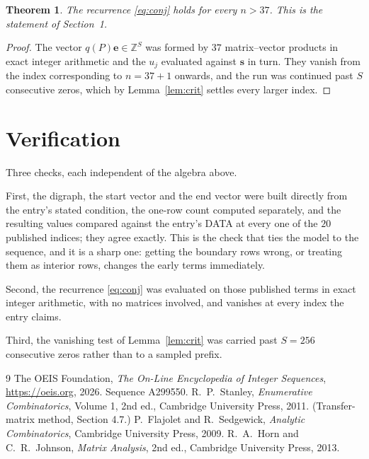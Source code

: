 \documentclass[11pt,a4paper]{article}
\theoremstyle{plain}
\newtheorem{theorem}{Theorem}
\theoremstyle{definition}
\begin{document}
\begin{theorem}
The recurrence \eqref{eq:conj} holds for every $n>37$. This is the statement of
Section~1.
\end{theorem}

\begin{proof}
The vector $q(P)\mathbf{e}\in\mathbb{Z}^{S}$ was formed by $37$ matrix--vector
products in exact integer arithmetic and the $u_j$ evaluated against $\mathbf{s}$ in turn.
They vanish from the index corresponding to $n=37+1$ onwards, and the run was continued
past $S$ consecutive zeros, which by Lemma~\ref{lem:crit} settles every larger index.
\end{proof}

\section{Verification}

Three checks, each independent of the algebra above.

First, the digraph, the start vector and the end vector were built directly from the
entry's stated condition, the one-row count computed separately, and the resulting values
compared against the entry's DATA at every one of the $20$ published indices; they
agree exactly. This is the check that ties the model to the sequence, and it is a sharp one:
getting the boundary rows wrong, or treating them as interior rows, changes the early terms
immediately.

Second, the recurrence \eqref{eq:conj} was evaluated on those published terms in exact
integer arithmetic, with no matrices involved, and vanishes at every index the entry claims.

Third, the vanishing test of Lemma~\ref{lem:crit} was carried past $S=256$ consecutive
zeros rather than to a sampled prefix.

\begin{thebibliography}{9}
 The OEIS Foundation, \emph{The On-Line Encyclopedia of Integer
Sequences}, \url{https://oeis.org}, 2026. Sequence A299550.
 R.~P.~Stanley, \emph{Enumerative Combinatorics}, Volume 1, 2nd ed.,
Cambridge University Press, 2011. (Transfer-matrix method, Section 4.7.)
 P.~Flajolet and R.~Sedgewick, \emph{Analytic Combinatorics}, Cambridge
University Press, 2009.
 R.~A.~Horn and C.~R.~Johnson, \emph{Matrix Analysis}, 2nd ed., Cambridge
University Press, 2013.
\end{thebibliography}
\end{document}
